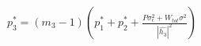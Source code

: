 \documentclass[preview]{standalone}
\begin{document}
\begin{align*}
p_3^\ast = \left(m_3 - 1\right) \left( p_1^\ast + p_2^\ast + \frac{P \sigma_\epsilon^2 + W_{tot} \sigma^2}{\left|\hat{h_3}\right|^2} \right)
\end{align*}
\end{document}
